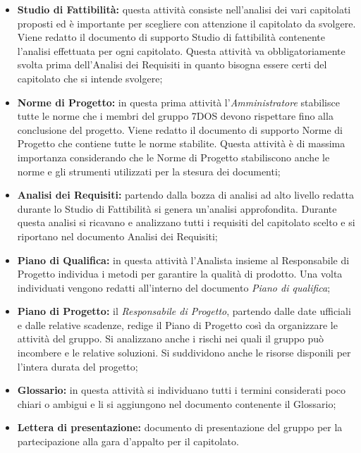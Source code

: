 \begin{itemize}

	\item \textbf{Studio di Fattibilità:} questa attività consiste nell'analisi dei vari capitolati proposti ed è importante per scegliere con attenzione il capitolato da svolgere. Viene redatto il documento di supporto Studio di fattibilità contenente l'analisi effettuata per ogni capitolato. Questa attività va obbligatoriamente svolta prima dell'Analisi dei Requisiti in quanto bisogna essere certi del capitolato che si intende svolgere;

	\item \textbf{Norme di Progetto:} in questa prima attività l'\emph{Amministratore} stabilisce tutte le norme che i membri del gruppo 7DOS devono rispettare fino alla conclusione del progetto. Viene redatto il documento di supporto Norme di Progetto che contiene tutte le norme stabilite. Questa attività è di massima importanza considerando che le Norme di Progetto stabiliscono anche le norme e gli strumenti utilizzati per la stesura dei documenti;

	\item \textbf{Analisi dei Requisiti:} partendo dalla bozza di analisi ad alto livello redatta durante lo Studio di Fattibilità si genera un'analisi approfondita. Durante questa analisi si ricavano e analizzano tutti i requisiti del capitolato scelto e si riportano nel documento Analisi dei Requisiti;

	\item \textbf{Piano di Qualifica:} in questa attività l'Analista insieme al Responsabile di Progetto individua i metodi per garantire la qualità di prodotto. Una volta individuati vengono redatti all'interno del documento \textit{Piano di qualifica};

	\item \textbf{Piano di Progetto:} il \emph{Responsabile di Progetto}, partendo dalle date ufficiali e dalle relative scadenze, redige il Piano di Progetto così da organizzare le attività del gruppo. Si analizzano anche i rischi nei quali il gruppo può incombere e le relative soluzioni. Si suddividono anche le risorse disponili per l'intera durata del progetto;

	\item \textbf{Glossario:} in questa attività si individuano tutti i termini considerati poco chiari o ambigui e li si aggiungono nel documento contenente il Glossario;
	
	\item \textbf{Lettera di presentazione:} documento di presentazione del gruppo per la partecipazione alla gara d'appalto per il capitolato.

\end{itemize}

